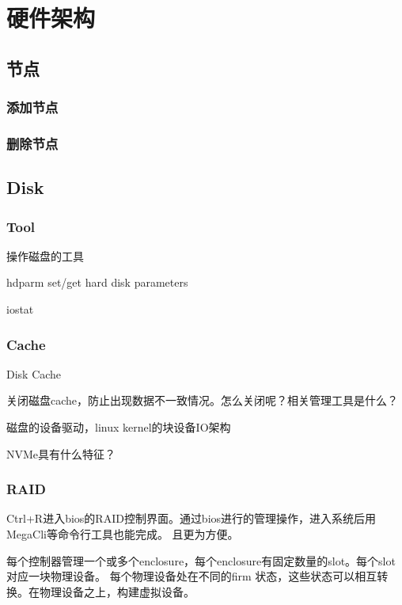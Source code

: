 \chapter{硬件架构}

\section{节点}

\subsection{添加节点}

\subsection{删除节点}

\section{Disk}

\subsection{Tool}

操作磁盘的工具
\begin{enumbox}
\item hdparm set/get hard disk parameters
\item iostat
\end{enumbox}

\subsection{Cache}

Disk Cache

关闭磁盘cache，防止出现数据不一致情况。怎么关闭呢？相关管理工具是什么？

磁盘的设备驱动，linux kernel的块设备IO架构

NVMe具有什么特征？

\subsection{RAID}

Ctrl+R进入bios的RAID控制界面。通过bios进行的管理操作，进入系统后用MegaCli等命令行工具也能完成。
且更为方便。

每个控制器管理一个或多个enclosure，每个enclosure有固定数量的slot。每个slot对应一块物理设备。
每个物理设备处在不同的firm 状态，这些状态可以相互转换。在物理设备之上，构建虚拟设备。

